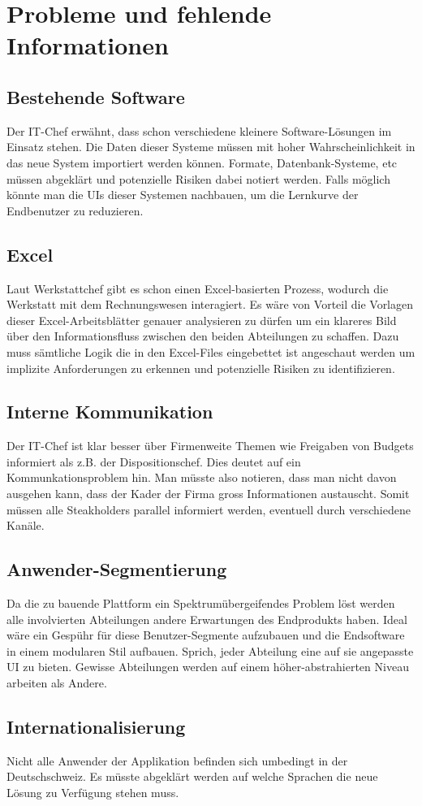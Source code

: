 \section{Probleme und fehlende Informationen}

  \subsection{Bestehende Software}
  Der IT-Chef erwähnt, dass schon verschiedene kleinere Software-Lösungen im Einsatz stehen.
  Die Daten dieser Systeme müssen mit hoher Wahrscheinlichkeit in das neue System importiert werden können.
  Formate, Datenbank-Systeme, etc müssen abgeklärt und potenzielle Risiken dabei notiert werden.
  Falls möglich könnte man die UIs dieser Systemen nachbauen, um die Lernkurve der Endbenutzer zu reduzieren.

  \subsection{Excel}
  Laut Werkstattchef gibt es schon einen Excel-basierten Prozess, wodurch die Werkstatt mit dem Rechnungswesen interagiert.
  Es wäre von Vorteil die Vorlagen dieser Excel-Arbeitsblätter genauer analysieren zu dürfen um ein klareres Bild über den Informationsfluss zwischen den beiden Abteilungen zu schaffen.
  Dazu muss sämtliche Logik die in den Excel-Files eingebettet ist angeschaut werden um implizite Anforderungen zu erkennen und potenzielle Risiken zu identifizieren.
  
  \subsection{Interne Kommunikation}
  Der IT-Chef ist klar besser über Firmenweite Themen wie Freigaben von Budgets informiert als z.B. der Dispositionschef. Dies deutet auf ein Kommunkationsproblem hin.
  Man müsste also notieren, dass man nicht davon ausgehen kann, dass der Kader der Firma gross Informationen austauscht. Somit müssen alle Steakholders parallel informiert werden, eventuell durch verschiedene Kanäle.

  \subsection{Anwender-Segmentierung}
  Da die zu bauende Plattform ein Spektrumübergeifendes Problem löst werden alle involvierten Abteilungen andere Erwartungen des Endprodukts haben.
  Ideal wäre ein Gespühr für diese Benutzer-Segmente aufzubauen und die Endsoftware in einem modularen Stil aufbauen. Sprich, jeder Abteilung eine auf sie angepasste UI zu bieten.
  Gewisse Abteilungen werden auf einem höher-abstrahierten Niveau arbeiten als Andere.
  
  \subsection{Internationalisierung}
  Nicht alle Anwender der Applikation befinden sich umbedingt in der Deutschschweiz. Es müsste abgeklärt werden auf welche Sprachen die neue Lösung zu Verfügung stehen muss.

